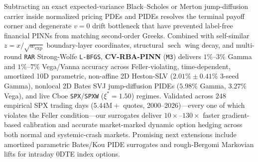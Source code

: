 \documentclass[11pt,a4paper]{article}
\begin{document}
Subtracting an exact expected-variance Black--Scholes or Merton jump-diffusion carrier inside normalized pricing PDEs and PIDEs resolves the terminal payoff corner and degenerate $v = 0$ drift bottleneck that have prevented label-free financial PINNs from matching second-order Greeks. Combined with self-similar $z = x/\sqrt{w_{\mathrm{exp}}}$ boundary-layer coordinates, structural $\operatorname{sech}$ wing decay, and multi-round \texttt{RAR} Strong-Wolfe \texttt{L-BFGS}, \textbf{CV-RBA-PINN} (\texttt{M3}) delivers $1\%\text{--}3\%$ Gamma and $1\%\text{--}7\%$ Vega/Vanna accuracy across Feller-violating, time-dependent, amortized 10D parametric, non-affine 2D Heston-SLV ($2.01\% \pm 0.41\%$ 3-seed Gamma), nonlocal 2D Bates SVJ jump-diffusion PIDEs ($5.98\%$ Gamma, $3.27\%$ Vega), and live Cboe \texttt{SPX}/\texttt{SPXW} ($\xi^* = 1.50$) regimes. Validated across $248$ empirical SPX trading days ($5.44\text{M}+$ quotes, 2000--2026)---every one of which violates the Feller condition---our surrogates deliver $10\times\text{--}130\times$ faster gradient-based calibration and accurate market-marked dynamic option hedging across both normal and systemic-crash markets. Promising next extensions include amortized parametric Bates/Kou PIDE surrogates and rough-Bergomi Markovian lifts for intraday 0DTE index options.



\end{document}
